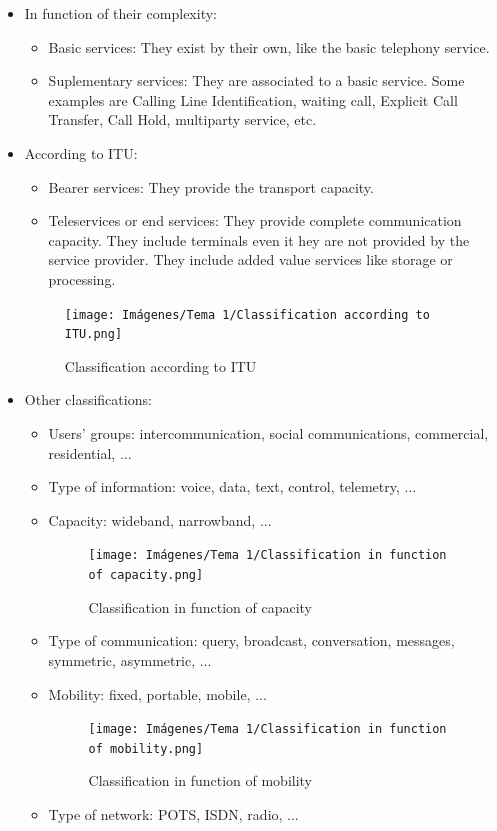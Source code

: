 \documentclass[
	12pt,
	twoside
]{book}
\begin{document}
\begin{itemize}
	\item {
		In function of their complexity:
		\begin{itemize}
			\item Basic services: They exist by their own, like the basic telephony service.
			\item Suplementary services: They are associated to a basic service. Some examples are Calling Line Identification, waiting call, Explicit Call Transfer, Call Hold, multiparty service, etc.
		\end{itemize}
	}
	\item {
		According to ITU:
		\begin{itemize}
			\item Bearer services: They provide the transport capacity.
			\item Teleservices or end services: They provide complete communication capacity. They include terminals even it hey are not provided by the service provider. They include added value services like storage or processing.
		\end{itemize}
		\begin{figure}[H]
			\centering
			\texttt{[image: Imágenes/Tema 1/Classification according to ITU.png]}
			\caption{
				\label{fig:unit1_according}
				Classification according to ITU
			}
		\end{figure}
	}
	\item {
		Other classifications:

		\begin{itemize}
			\item Users' groups: intercommunication, social communications, commercial, residential, ...
			\item Type of information: voice, data, text, control, telemetry, ...
			\item {
				Capacity: wideband, narrowband, ...

				\begin{figure}[H]
					\centering
					\texttt{[image: Imágenes/Tema 1/Classification in function of capacity.png]}
					\caption{
						\label{fig:unit1_capacity}
						Classification in function of capacity
					}
				\end{figure}
			}
			\item Type of communication: query, broadcast, conversation, messages, symmetric, asymmetric, ...
			\item {
				Mobility: fixed, portable, mobile, ...

				\begin{figure}[H]
					\centering
					\texttt{[image: Imágenes/Tema 1/Classification in function of mobility.png]}
					\caption{
						\label{fig:unit1_mobility}
						Classification in function of mobility
					}
				\end{figure}
			}
			\item Type of network: POTS, ISDN, radio, ...
		\end{itemize}
	}
\end{itemize}
\end{document}
